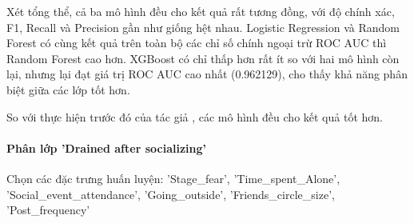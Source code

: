     \FloatBarrier

    Xét tổng thể, cả ba mô hình đều cho kết quả rất tương đồng, với độ chính xác, F1, Recall và Precision gần như giống hệt nhau. Logistic Regression và Random Forest có cùng kết quả trên toàn bộ các chỉ số chính ngoại trừ ROC AUC thì Random Forest cao hơn. XGBoost có chỉ thấp hơn rất ít so với hai mô hình còn lại, nhưng lại đạt giá trị ROC AUC cao nhất (0.962129), cho thấy khả năng phân biệt giữa các lớp tốt hơn.

    So với thực hiện trước đó của tác giả \cite{kapilavayi}, các mô hình đều cho kết quả tốt hơn.

    \FloatBarrier


    \paragraph{Phân lớp 'Drained after socializing'}
    \leavevmode

    Chọn các đặc trưng huấn luyện: 'Stage\_fear', 'Time\_spent\_Alone', 'Social\_event\_attendance', 'Going\_outside', 'Friends\_circle\_size', 'Post\_frequency'

